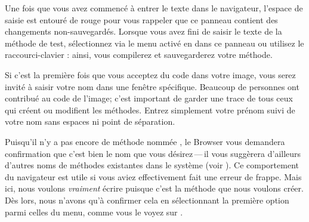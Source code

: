 \documentclass[a4paper,10pt,twoside]{book}
\begin{document}
Une fois que vous avez commencé à entrer le texte dans le
navigateur, l'espace de saisie est entouré de rouge pour vous
rappeler que ce panneau contient des changements non-sauvegardés.
Lorsque vous avez fini de saisir le texte de la méthode de test,
sélectionnez  via le menu activé en \actclickant{} dans ce panneau ou utilisez le raccourci-clavier
: ainsi, vous compilerez et sauvegarderez votre méthode.

Si c'est la première fois que vous acceptez du code dans
votre image, vous serez invité à saisir votre nom dans une
fenêtre spécifique. Beaucoup de personnes ont contribué au code de
l'image; c'est important de garder une trace de tous ceux qui créent
ou modifient les méthodes. Entrez simplement votre prénom suivi de
votre nom sans espaces ni point de séparation.


Puisqu'il n'y a pas encore de méthode nommée , le 
Browser vous demandera confirmation que c'est bien le nom que vous
désirez\,---\,il vous suggèrera d'ailleurs d'autres noms de
méthodes existantes dans le système (voir ).
Ce comportement du navigateur est utile si vous aviez effectivement
fait une erreur de frappe. Mais ici, nous voulons \emph{vraiment}
écrire  puisque c'est la méthode que nous voulons
créer. Dès lors, nous n'avons qu'à confirmer cela en
sélectionnant la première option parmi celles du menu, comme vous
le voyez sur . 
\end{document}
